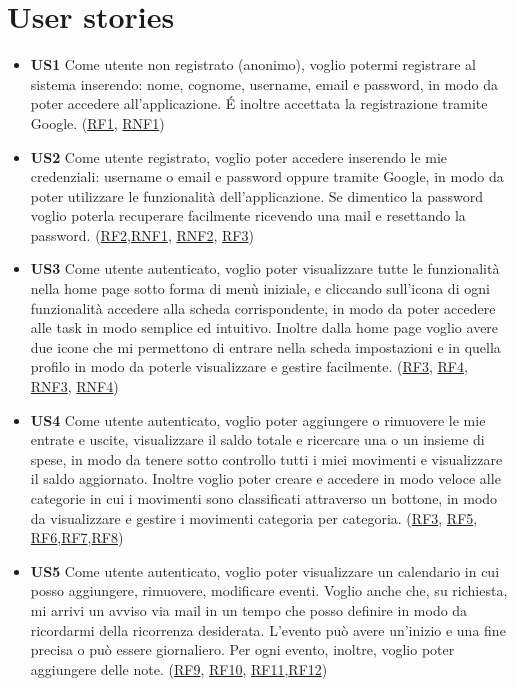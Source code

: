 \documentclass[a4paper,12pt]{article}
\begin{document}
\section*{User stories}
\begin{itemize} \setlength\itemsep{0.01em}
\item \textbf {US1} Come utente non registrato (anonimo), voglio potermi registrare al sistema inserendo: nome, cognome, username, email e password, in modo da poter accedere all'applicazione. É inoltre accettata la registrazione tramite Google. (\hyperlink{RF1}{RF1}, \hyperlink{RNF1}{RNF1})

\item\textbf {US2} Come utente registrato, voglio poter accedere inserendo le mie credenziali: username o email e password oppure tramite Google, in modo da poter utilizzare le funzionalità dell'applicazione. Se dimentico la password voglio poterla recuperare facilmente ricevendo una mail e resettando la password. (\hyperlink{RF2}{RF2},\hyperlink{RNF1}{RNF1}, \hyperlink{RNF2}{RNF2}, \hyperlink{RNF3}{RF3})

\item \textbf {US3} Come utente autenticato, voglio poter visualizzare tutte le funzionalità nella home page sotto forma di menù iniziale, e cliccando sull'icona di ogni funzionalità accedere alla scheda corrispondente, in modo da poter accedere alle task in modo semplice ed intuitivo. Inoltre dalla home page voglio avere due icone che mi permettono di entrare nella scheda impostazioni e in quella profilo in modo da poterle visualizzare e gestire facilmente. (\hyperlink{RF3}{RF3}, \hyperlink{RF4}{RF4}, \hyperlink{RNF3}{RNF3}, \hyperlink{RNF4}{RNF4})

\item \textbf {US4} Come utente autenticato, voglio poter aggiungere o rimuovere le mie entrate e uscite, visualizzare il saldo totale e ricercare una o un insieme di spese, in modo da tenere sotto controllo tutti i miei movimenti e visualizzare il saldo aggiornato. Inoltre voglio poter creare e accedere in modo veloce alle categorie in cui i movimenti sono classificati attraverso un bottone, in modo da visualizzare e gestire i movimenti categoria per categoria. (\hyperlink{RF3}{RF3}, \hyperlink{RF5}{RF5}, \hyperlink{RF6}{RF6},\hyperlink{RF7}{RF7},\hyperlink{RF8}{RF8})

\item \textbf {US5}  Come utente autenticato, voglio poter visualizzare un calendario in cui posso aggiungere, rimuovere, modificare eventi. Voglio anche che, su richiesta, mi arrivi un avviso via mail in un tempo che posso definire in modo da ricordarmi della ricorrenza desiderata. L'evento può avere un'inizio e una fine precisa o può essere giornaliero. Per ogni evento, inoltre, voglio poter aggiungere delle note. (\hyperlink{RF9}{RF9}, \hyperlink{RF10}{RF10}, \hyperlink{RF11}{RF11},\hyperlink{RF12}{RF12})


\end{itemize}
\end{document}
